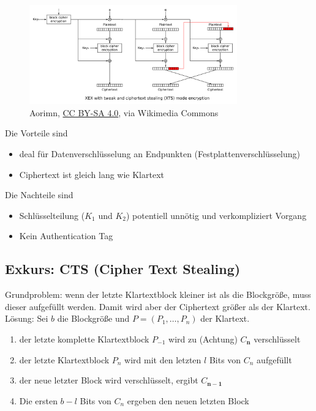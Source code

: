 \begin{figure}[h]
    \includegraphics[width=0.8\textwidth]{figures/fig02-XTS_mode_encryption}
    \centering
    \caption{Aorimn, \href{https://creativecommons.org/licenses/by-sa/4.0}{CC BY-SA 4.0}, via Wikimedia Commons}
\end{figure}

Die Vorteile sind 

\begin{itemize}
    \item deal für Datenverschlüsselung an Endpunkten (Festplattenverschlüsselung)
    \item Ciphertext ist gleich lang wie Klartext
\end{itemize}

Die Nachteile sind

\begin{itemize}
    \item Schlüsselteilung ($K_1$ und $K_2$) potentiell unnötig und verkompliziert Vorgang
    \item Kein Authentication Tag
\end{itemize}

\subsection{Exkurs: CTS (Cipher Text Stealing)}

Grundproblem: wenn der letzte Klartextblock kleiner ist als die Blockgröße, muss dieser aufgefüllt werden. Damit wird aber der Ciphertext größer als der Klartext. \\

Lösung: Sei $b$ die Blockgröße und $P = (P_1, \ldots, P_n)$ der Klartext.

\begin{enumerate}
    \item der letzte komplette Klartextblock $P_{-1}$ wird zu (Achtung) $C_\mathbf{n}$ verschlüsselt 
    \item der letzte Klartextblock $P_n$ wird mit den letzten $l$ Bits von $C_n$ aufgefüllt
    \item der neue letzter Block wird verschlüsselt, ergibt $C_\mathbf{n-1}$
    \item Die ersten $b-l$ Bits von $C_n$ ergeben den neuen letzten Block
\end{enumerate}

